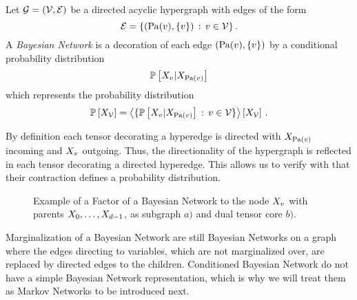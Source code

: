 \begin{definition}\label{def:bayesianNetwork}
	Let $\mathcal{G}=(\mathcal{V},\mathcal{E})$ be a directed acyclic hypergraph with edges of the form 
		\[ \mathcal{E} = \{(\mathrm{Pa}(v),\{v\}) \, : \, v\in\mathcal{V}\} \, . \]
	A \emph{Bayesian Network} is a decoration of each edge $(\mathrm{Pa}(v),\{v\})$ by a conditional probability distribution
		\[ \mathbb{P}\left[X_{v}|X_{\mathrm{Pa}(v)}\right] \]
	which represents the probability distribution
	\begin{align*}
		\mathbb{P}\left[X_{\mathcal{V}}\right] = \left\langle \{\mathbb{P}\left[X_{v}|X_{\mathrm{Pa}(v)}\right] \, : \, v\in\mathcal{V}\}\right\rangle \left[ X_{\mathcal{V}} \right] \, .
	\end{align*}
\end{definition}

%
By definition each tensor decorating a hyperedge is directed with $X_{\mathrm{Pa}(v)}$ incoming and $X_{v}$ outgoing.
Thus, the directionality of the hypergraph is reflected in each tensor decorating a directed hyperedge.
This allows us to verify with  that their contraction defines a probability distribution.



\begin{figure}[h]
\begin{center}
	
\end{center}
\caption{Example of a Factor of a Bayesian Network to the node $X_{v}$ with parents $X_{0},\ldots,X_{d-1}$, as subgraph $a)$ and dual tensor core $b)$.}
\label{fig:BayesianFactor}
\end{figure}


Marginalization of a Bayesian Network are still Bayesian Networks on a graph where the edges directing to variables, which are not marginalized over, are replaced by directed edges to the children.
Conditioned Bayesian Network do not have a simple Bayesian Network representation, which is why we will treat them as Markov Networks to be introduced next.


